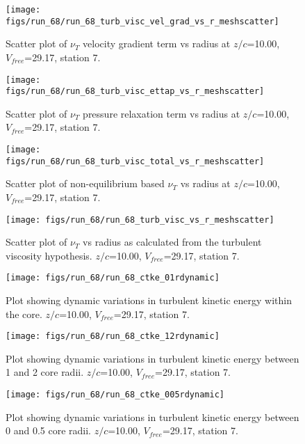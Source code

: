 \begin{figure}[H]
\centering
\texttt{[image: figs/run\_68/run\_68\_turb\_visc\_vel\_grad\_vs\_r\_meshscatter]}
\caption{Scatter plot of $\nu_T$ velocity gradient term vs radius at $z/c$=10.00, $V_{free}$=29.17, station 7.}
\end{figure}


\begin{figure}[H]
\centering
\texttt{[image: figs/run\_68/run\_68\_turb\_visc\_ettap\_vs\_r\_meshscatter]}
\caption{Scatter plot of $\nu_T$ pressure relaxation term vs radius at $z/c$=10.00, $V_{free}$=29.17, station 7.}
\end{figure}


\begin{figure}[H]
\centering
\texttt{[image: figs/run\_68/run\_68\_turb\_visc\_total\_vs\_r\_meshscatter]}
\caption{Scatter plot of non-equilibrium based $\nu_T$ vs radius at $z/c$=10.00, $V_{free}$=29.17, station 7.}
\end{figure}


\begin{figure}[H]
\centering
\texttt{[image: figs/run\_68/run\_68\_turb\_visc\_vs\_r\_meshscatter]}
\caption{Scatter plot of $\nu_T$ vs radius as calculated from the turbulent viscosity hypothesis. $z/c$=10.00, $V_{free}$=29.17, station 7.}
\end{figure}


\begin{figure}[H]
\centering
\texttt{[image: figs/run\_68/run\_68\_ctke\_01rdynamic]}
\caption{Plot showing dynamic variations in turbulent kinetic energy within the core. $z/c$=10.00, $V_{free}$=29.17, station 7.}
\end{figure}


\begin{figure}[H]
\centering
\texttt{[image: figs/run\_68/run\_68\_ctke\_12rdynamic]}
\caption{Plot showing dynamic variations in turbulent kinetic energy between 1 and 2 core radii. $z/c$=10.00, $V_{free}$=29.17, station 7.}
\end{figure}


\begin{figure}[H]
\centering
\texttt{[image: figs/run\_68/run\_68\_ctke\_005rdynamic]}
\caption{Plot showing dynamic variations in turbulent kinetic energy between 0 and 0.5 core radii. $z/c$=10.00, $V_{free}$=29.17, station 7.}
\end{figure}


